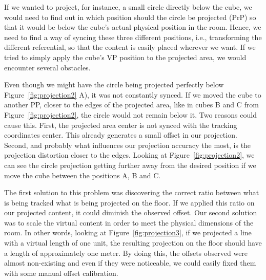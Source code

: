 If we wanted to project, for instance, a small circle directly below the cube, we would need to find out in which position should the circle be projected (\ac{PrP}) so that it would be below the cube's actual physical position in the room. Hence, we need to find a way of syncing these three different positions, i.e., transforming the different referential, so that the content is easily placed wherever we want. If we tried to simply apply the cube's \ac{VP} position to the projected area, we would encounter several obstacles.

Even though we might have the circle being projected perfectly below Figure~\ref{fig:projection2} A), it was not constantly synced.
If we moved the cube to another \ac{PP}, closer to the edges of the projected area, like in cubes B and C from Figure~\ref{fig:projection2}, the circle would not remain below it. 
Two reasons could cause this. First, the projected area center is not synced with the tracking coordinates center. 
This already generates a small offset in our projection. 
Second, and probably what influences our projection accuracy the most, is the projection distortion closer to the edges.
Looking at Figure~\ref{fig:projection2}, we can see the circle projection getting further away from the desired position if we move the cube between the positions A, B and C.

The first solution to this problem was discovering the correct ratio between what is being tracked what is being projected on the floor. 
If we applied this ratio on our projected content, it could diminish the observed offset. 
Our second solution was to scale the virtual content in order to meet the physical dimensions of the room. 
In other words, looking at Figure~\ref{fig:projection3}, if we projected a line with a virtual length of one unit, the resulting projection on the floor should have a length of approximately one meter.
By doing this, the offsets observed were almost non-existing and even if they were noticeable, we could easily fixed them with some manual offset calibration.

